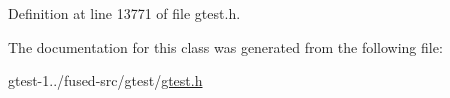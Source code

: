 \-Definition at line 13771 of file gtest.\-h.



\-The documentation for this class was generated from the following file\-:\begin{DoxyCompactItemize}
\item 
gtest-\/1../fused-\/src/gtest/\hyperlink{fused-src_2gtest_2gtest_8h}{gtest.\-h}\end{DoxyCompactItemize}
